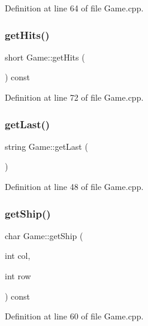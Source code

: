 Definition at line 64 of file Game.\+cpp.

\mbox{\label{class_game_a8a0b7bfc0cea9cc38dae79516cb325aa}} 
\subsubsection{\texorpdfstring{get\+Hits()}{getHits()}}
{\footnotesize\ttfamily short Game\+::get\+Hits (\begin{DoxyParamCaption}{ }\end{DoxyParamCaption}) const}



Definition at line 72 of file Game.\+cpp.

\mbox{\label{class_game_ab9f516c5cca41cf4807dc71108af4257}} 
\subsubsection{\texorpdfstring{get\+Last()}{getLast()}}
{\footnotesize\ttfamily string Game\+::get\+Last (\begin{DoxyParamCaption}{ }\end{DoxyParamCaption})}



Definition at line 48 of file Game.\+cpp.

\mbox{\label{class_game_aea2b0b27d7caacd0c5a822fc24cd9794}} 
\subsubsection{\texorpdfstring{get\+Ship()}{getShip()}}
{\footnotesize\ttfamily char Game\+::get\+Ship (\begin{DoxyParamCaption}\item[{int}]{col,  }\item[{int}]{row }\end{DoxyParamCaption}) const}



Definition at line 60 of file Game.\+cpp.

\mbox{\label{class_game_a17a8524e3b04582d61a17133d8685ec6}} 
